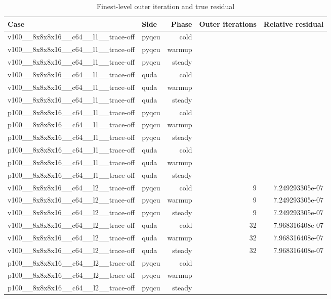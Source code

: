\begin{table}[htbp]
\centering
\caption{Finest-level outer iteration and true residual}
\small
\begin{tabular}{@{}llrrr@{}}
\toprule
Case & Side & Phase & Outer iterations & Relative residual \\
\midrule
v100\_\_8x8x8x16\_\_c64\_\_l1\_\_trace-off & pyqcu & cold &  &  \\
v100\_\_8x8x8x16\_\_c64\_\_l1\_\_trace-off & pyqcu & warmup &  &  \\
v100\_\_8x8x8x16\_\_c64\_\_l1\_\_trace-off & pyqcu & steady &  &  \\
v100\_\_8x8x8x16\_\_c64\_\_l1\_\_trace-off & quda & cold &  &  \\
v100\_\_8x8x8x16\_\_c64\_\_l1\_\_trace-off & quda & warmup &  &  \\
v100\_\_8x8x8x16\_\_c64\_\_l1\_\_trace-off & quda & steady &  &  \\
p100\_\_8x8x8x16\_\_c64\_\_l1\_\_trace-off & pyqcu & cold &  &  \\
p100\_\_8x8x8x16\_\_c64\_\_l1\_\_trace-off & pyqcu & warmup &  &  \\
p100\_\_8x8x8x16\_\_c64\_\_l1\_\_trace-off & pyqcu & steady &  &  \\
p100\_\_8x8x8x16\_\_c64\_\_l1\_\_trace-off & quda & cold &  &  \\
p100\_\_8x8x8x16\_\_c64\_\_l1\_\_trace-off & quda & warmup &  &  \\
p100\_\_8x8x8x16\_\_c64\_\_l1\_\_trace-off & quda & steady &  &  \\
v100\_\_8x8x8x16\_\_c64\_\_l2\_\_trace-off & pyqcu & cold & 9 & 7.249293305e-07 \\
v100\_\_8x8x8x16\_\_c64\_\_l2\_\_trace-off & pyqcu & warmup & 9 & 7.249293305e-07 \\
v100\_\_8x8x8x16\_\_c64\_\_l2\_\_trace-off & pyqcu & steady & 9 & 7.249293305e-07 \\
v100\_\_8x8x8x16\_\_c64\_\_l2\_\_trace-off & quda & cold & 32 & 7.968316408e-07 \\
v100\_\_8x8x8x16\_\_c64\_\_l2\_\_trace-off & quda & warmup & 32 & 7.968316408e-07 \\
v100\_\_8x8x8x16\_\_c64\_\_l2\_\_trace-off & quda & steady & 32 & 7.968316408e-07 \\
p100\_\_8x8x8x16\_\_c64\_\_l2\_\_trace-off & pyqcu & cold &  &  \\
p100\_\_8x8x8x16\_\_c64\_\_l2\_\_trace-off & pyqcu & warmup &  &  \\
p100\_\_8x8x8x16\_\_c64\_\_l2\_\_trace-off & pyqcu & steady &  &  \\

\end{tabular}
\end{table}
